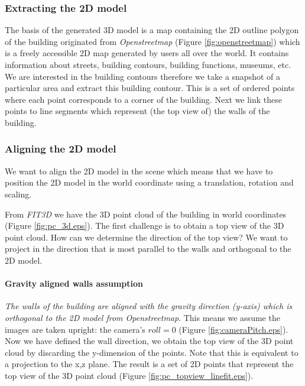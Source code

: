 \subsubsection{Extracting the 2D model}
The basis of the generated 3D model is a map containing the 2D outline polygon
of the building originated from \emph{Openstreetmap\cite{Openstreetmap}} 
(Figure \ref{fig:openstreetmap}) which is a freely accessible 2D map generated by
users all over the world. It contains information about streets, building
contours, building functions, museums, etc.  We are interested in the building
contours therefore we take a snapshot of a particular area and extract this building
contour.  This is a set of ordered points where each point corresponds to a
corner of the building.  Next we link these points to line segments which
represent (the top view of) the walls of the building.

\subsubsection{Aligning the 2D model}
We want to align the 2D model in the scene which means that we have to
position the 2D model in the world coordinate using a translation, rotation and
scaling.

From \emph{FIT3D\cite{FIT3D}} we have the 3D point cloud of the building in world coordinates
(Figure \ref{fig:pc_3d.eps}).
The first challenge is to obtain a top view of the 3D point cloud.
How can we determine the direction of the top view? We want to project in the
direction that is most parallel to the walls and orthogonal to the 2D model.

\paragraph{Gravity aligned walls assumption}
	\emph{The walls of the building are aligned with the gravity direction
	(y-axis) which is orthogonal to the 2D model from \emph{Openstreetmap\cite{Openstreetmap}}}. This means
	we assume the images are taken upright: the camera's $roll=0$ (Figure
	\ref{fig:cameraPitch.eps}).\\

Now we have defined the wall direction, we obtain the top view of the 3D point
cloud by discarding the y-dimension of the points.  Note that this is equivalent to a
projection to the x,z plane. The result is a set of 2D points that represent the
top view of the 3D point cloud (Figure \ref{fig:pc_topview_linefit.eps}).

